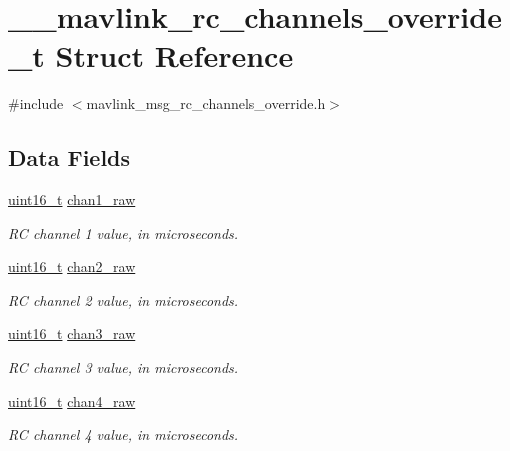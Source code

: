 \hypertarget{struct____mavlink__rc__channels__override__t}{\section{\-\_\-\-\_\-mavlink\-\_\-rc\-\_\-channels\-\_\-override\-\_\-t Struct Reference}
\label{struct____mavlink__rc__channels__override__t}
}


{\ttfamily \#include $<$mavlink\-\_\-msg\-\_\-rc\-\_\-channels\-\_\-override.\-h$>$}

\subsection*{Data Fields}
\begin{DoxyCompactItemize}
\item 
\hyperlink{stdint_8h_a273cf69d639a59973b6019625df33e30}{uint16\-\_\-t} \hyperlink{struct____mavlink__rc__channels__override__t_aeb8348ef82cccce6d514fdf1d2a4d216}{chan1\-\_\-raw}
\begin{DoxyCompactList}\small\item\em R\-C channel 1 value, in microseconds. \end{DoxyCompactList}\item 
\hyperlink{stdint_8h_a273cf69d639a59973b6019625df33e30}{uint16\-\_\-t} \hyperlink{struct____mavlink__rc__channels__override__t_ab3632a873125a666e50f889d854a41d4}{chan2\-\_\-raw}
\begin{DoxyCompactList}\small\item\em R\-C channel 2 value, in microseconds. \end{DoxyCompactList}\item 
\hyperlink{stdint_8h_a273cf69d639a59973b6019625df33e30}{uint16\-\_\-t} \hyperlink{struct____mavlink__rc__channels__override__t_aaf6d972bf21b65c73095fc5c45aff71a}{chan3\-\_\-raw}
\begin{DoxyCompactList}\small\item\em R\-C channel 3 value, in microseconds. \end{DoxyCompactList}\item 
\hyperlink{stdint_8h_a273cf69d639a59973b6019625df33e30}{uint16\-\_\-t} \hyperlink{struct____mavlink__rc__channels__override__t_afc315c11bfffdd9aa051799c5d2d0fae}{chan4\-\_\-raw}
\begin{DoxyCompactList}\small\item\em R\-C channel 4 value, in microseconds. \end{DoxyCompactList}\item 

\end{DoxyCompactItemize}
